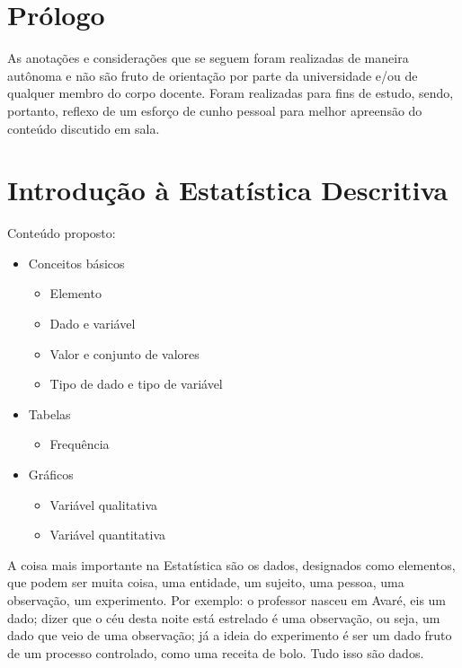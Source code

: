 \documentclass[a4paper]{article}
\newcommand{\aula}[2][]{\todo[inline,color=blue!10, #1]{\textbf{#2}}}
\begin{document}
	
	\section{Prólogo}
	
	As anotações e considerações que se seguem foram realizadas de maneira autônoma e não são fruto de orientação por parte da universidade e/ou de qualquer membro do corpo docente. Foram realizadas para fins de estudo, sendo, portanto, reflexo de um esforço de cunho pessoal para melhor apreensão do conteúdo discutido em sala.
	

	\aula{Início da aula de 25/06/2019}
	
	\section{Introdução à Estatística Descritiva}
	
	Conteúdo proposto:
	
	\begin{itemize}
		\item Conceitos básicos
		\begin{itemize}
			\item Elemento
			\item Dado e variável
			\item Valor e conjunto de valores
			\item Tipo de dado e tipo de variável
		\end{itemize}
		\item Tabelas
		\begin{itemize}
			\item Frequência
		\end{itemize}
		\item Gráficos
		\begin{itemize}
			\item Variável qualitativa
			\item Variável quantitativa
		\end{itemize}
	\end{itemize}
	
	A coisa mais importante na Estatística são os dados, designados como elementos, que podem ser muita coisa, uma entidade, um sujeito, uma pessoa, uma observação, um experimento. Por exemplo: o professor nasceu em Avaré, eis um dado; dizer que o céu desta noite está estrelado é uma observação, ou seja, um dado que veio de uma observação; já a ideia do experimento é ser um dado fruto de um processo controlado, como uma receita de bolo. Tudo isso são dados.
	
\end{document}
